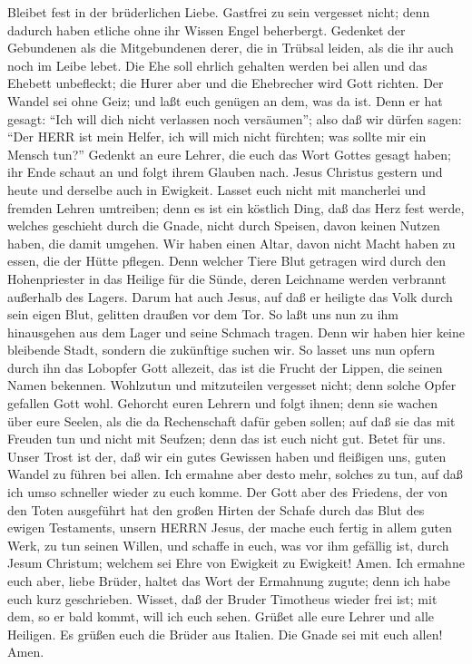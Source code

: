  Bleibet fest in der brüderlichen Liebe. 
Gastfrei zu sein vergesset nicht; denn dadurch haben etliche ohne ihr
Wissen Engel beherbergt.  Gedenket der Gebundenen als die
Mitgebundenen derer, die in Trübsal leiden, als die ihr auch noch im
Leibe lebet.  Die Ehe soll ehrlich gehalten werden bei allen
und das Ehebett unbefleckt; die Hurer aber und die Ehebrecher wird Gott
richten.  Der Wandel sei ohne Geiz; und laßt euch genügen an
dem, was da ist. Denn er hat gesagt: ``Ich will dich nicht verlassen
noch versäumen'';  also daß wir dürfen sagen: ``Der HERR ist
mein Helfer, ich will mich nicht fürchten; was sollte mir ein Mensch
tun?''  Gedenkt an eure Lehrer, die euch das Wort Gottes
gesagt haben; ihr Ende schaut an und folgt ihrem Glauben nach.
 Jesus Christus gestern und heute und derselbe auch in
Ewigkeit.  Lasset euch nicht mit mancherlei und fremden
Lehren umtreiben; denn es ist ein köstlich Ding, daß das Herz fest
werde, welches geschieht durch die Gnade, nicht durch Speisen, davon
keinen Nutzen haben, die damit umgehen.  Wir haben einen
Altar, davon nicht Macht haben zu essen, die der Hütte pflegen.
 Denn welcher Tiere Blut getragen wird durch den
Hohenpriester in das Heilige für die Sünde, deren Leichname werden
verbrannt außerhalb des Lagers.  Darum hat auch Jesus, auf
daß er heiligte das Volk durch sein eigen Blut, gelitten draußen vor dem
Tor.  So laßt uns nun zu ihm hinausgehen aus dem Lager und
seine Schmach tragen.  Denn wir haben hier keine bleibende
Stadt, sondern die zukünftige suchen wir.  So lasset uns
nun opfern durch ihn das Lobopfer Gott allezeit, das ist die Frucht der
Lippen, die seinen Namen bekennen.  Wohlzutun und
mitzuteilen vergesset nicht; denn solche Opfer gefallen Gott wohl.
 Gehorcht euren Lehrern und folgt ihnen; denn sie wachen
über eure Seelen, als die da Rechenschaft dafür geben sollen; auf daß
sie das mit Freuden tun und nicht mit Seufzen; denn das ist euch nicht
gut.  Betet für uns. Unser Trost ist der, daß wir ein gutes
Gewissen haben und fleißigen uns, guten Wandel zu führen bei allen.
 Ich ermahne aber desto mehr, solches zu tun, auf daß ich
umso schneller wieder zu euch komme.  Der Gott aber des
Friedens, der von den Toten ausgeführt hat den großen Hirten der Schafe
durch das Blut des ewigen Testaments, unsern HERRN Jesus, 
der mache euch fertig in allem guten Werk, zu tun seinen Willen, und
schaffe in euch, was vor ihm gefällig ist, durch Jesum Christum; welchem
sei Ehre von Ewigkeit zu Ewigkeit! Amen.  Ich ermahne euch
aber, liebe Brüder, haltet das Wort der Ermahnung zugute; denn ich habe
euch kurz geschrieben.  Wisset, daß der Bruder Timotheus
wieder frei ist; mit dem, so er bald kommt, will ich euch sehen.
 Grüßet alle eure Lehrer und alle Heiligen. Es grüßen euch
die Brüder aus Italien.  Die Gnade sei mit euch allen!
Amen.

